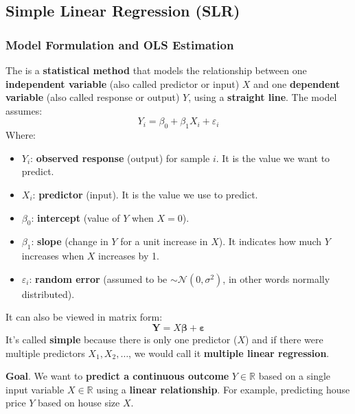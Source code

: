 \subsection{Simple Linear Regression (SLR)}\label{subsection: Simple Linear Regression}

\subsubsection{Model Formulation and OLS Estimation}

The  is a \textbf{statistical method} that models the relationship between one \textbf{independent variable} (also called predictor or input) $X$ and one \textbf{dependent variable} (also called response or output) $Y$, using a \textbf{straight line}. The model assumes:
\begin{equation}
    Y_{i} = \beta_{0} + \beta_{1} X_{i} + \varepsilon_{i}
\end{equation}
Where:
\begin{itemize}
    \item $Y_i$: \textbf{observed response} (output) for sample $i$. It is the value we want to predict.
    \item $X_i$: \textbf{predictor} (input). It is the value we use to predict.
    \item $\beta_0$: \textbf{intercept} (value of $Y$ when $X = 0$).
    \item $\beta_1$: \textbf{slope} (change in $Y$ for a unit increase in $X$). It indicates how much $Y$ increases when $X$ increases by 1.
    \item $\varepsilon_i$: \textbf{random error} (assumed to be $\sim \mathcal{N}\left(0, \sigma^{2}\right)$, in other words normally distributed).
\end{itemize}
It can also be viewed in matrix form:
\begin{equation*}
    \mathbf{Y} = X \boldsymbol{\beta} + \boldsymbol{\varepsilon}
\end{equation*}
It's called \textbf{simple} because there is only one predictor ($X$) and if there were multiple predictors $X_{1}, X_{2}, \dots$, we would call it \textbf{multiple linear regression}.

\highspace
\textcolor{Green3}{ \textbf{Goal}}. We want to \textbf{predict a continuous outcome} $Y \in \mathbb{R}$ based on a single input variable $X \in \mathbb{R}$ using a \textbf{linear relationship}. For example, predicting house price $Y$ based on house size $X$.

